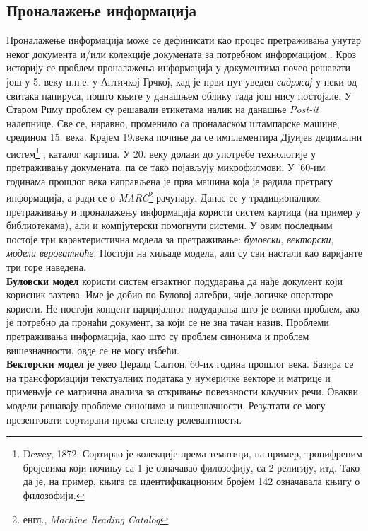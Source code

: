 \documentclass[11pt, serbianc, english, titlepage]{article}
\begin{document}
\subsection{Проналажење информација}
Проналажење информација може се дефинисати као процес претраживања унутар неког документа и/или колекције докумената за потребном информацијом.\cite{langville2011google}. Кроз историју се проблем проналажења информација у документима почео решавати још у 5. веку п.н.е. у Античкој Грчкој, кад је први пут уведен \emph{садржај} у неки од свитака папируса, пошто књиге у данашњем облику тада још нису постојале. У Старом Риму проблем су решавали етикетама налик на данашње \emph{Post-it} налепнице. Све се, наравно, променило са проналаском штампарске машине, средином 15. века. Крајем 19.века почиње да се имплементира Дјуијев децимални систем\footnote{Dewey, 1872. Сортирао је колекције према тематици, на пример, троцифреним бројевима који почињу са 1 је означавао филозофију, са 2 религију, итд. Тако да је, на пример, књига са идентификационим бројем 142 означавала књигу о филозофији.} , каталог картица. У 20. веку долази до употребе технологије у претраживању докумената, па се тако појављују микрофилмови. У '60-им годинама прошлог века направљена је прва машина која је радила претрагу информација, а ради се о \emph{MARC}\footnote{енгл., \emph{Machine Reading Catalog}} рачунару. Данас се у традиционалном претраживању и проналажењу информација користи систем картица (на пример у библиотекама), али и компјутерски помогнути системи. У овим последњим постоје три карактеристична модела за претраживање: \emph{буловски}, \emph{векторски}, \emph{модели вероватноће}\cite[Ch 1.2]{langville2011google}. Постоји на хиљаде модела, али су сви настали као варијанте три горе наведена.\\
\textbf{Буловски модел} користи систем егзактног подударања да нађе документ који корисник захтева. Име је добио по Буловој алгебри, чије логичке операторе користи. Не постоји концепт парцијалног подударања што је велики проблем, ако је потребно да пронаћи документ, за који се не зна тачан назив. Проблеми претраживања информација, као што су проблем синонима и проблем вишезначности, овде се не могу избећи. \\
\textbf{Векторски модел} је увео Џералд Салтон,'60-их година прошлог века. Базира се на трансформацији текстуалних података у нумеричке векторе и матрице и примењује се матрична анализа за откривање повезаности кључних речи. Овакви модели решавају проблеме синонима и вишезначности. Резултати се могу презентовати сортирани према степену релевантности.\cite{berry2005understanding}\\
\end{document}
